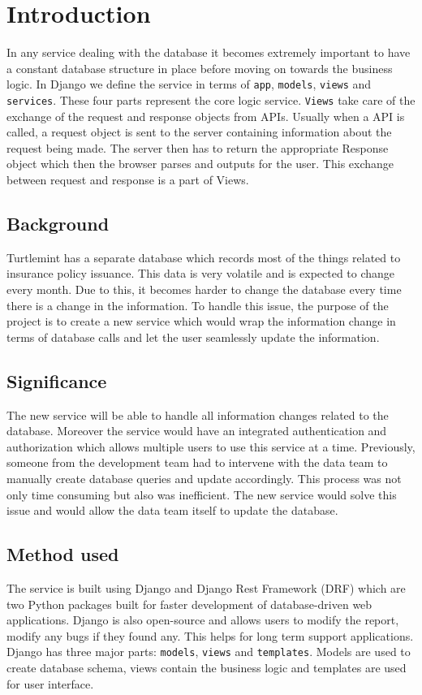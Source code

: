 \chapter{Introduction}

In any service dealing with the database it becomes extremely important to
have a constant database structure in place before moving on towards the
business logic. In Django we define the service in terms of \texttt{app},
\texttt{models}, \texttt{views} and \texttt{services}. These four parts
represent the core logic service.
\texttt{Views} take care of the exchange of the request and response objects from APIs.
Usually when a API is called, a request object is sent to the server containing
information about the request being made. The server then has to return the
appropriate Response object which then the browser parses and outputs for the
user. This exchange between request and response is a part of Views.

\section{Background}
Turtlemint has a separate database which records most of the things related to
insurance policy issuance. This data is very volatile and is expected to change
every month. Due to this, it becomes harder to change the database every time
there is a change in the information. To handle this issue, the purpose of the
project is to create a new service which would wrap the information change in
terms of database calls and let the user seamlessly update the information.

\section{Significance}
The new service will be able to handle all information changes related to the
database. Moreover the service would have an integrated authentication and
authorization which allows multiple users to use this service at a time.
Previously, someone from the development team had to intervene with the data
team to manually create database queries and update accordingly. This process
was not only time consuming but also was inefficient. The new service would
solve this issue and would allow the data team itself to update the database.

\section{Method used}
The service is built using Django and Django Rest Framework (DRF) which are
two Python packages built for faster development of database-driven web
applications. Django is also open-source and allows users to modify the
report, modify any bugs if they found any. This helps for long term
support applications. Django has three major parts: \texttt{models},
\texttt{views} and \texttt{templates}. Models are used to create database
schema, views contain the business logic and templates are used for user
interface.

